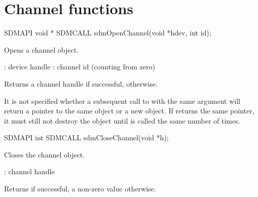 \documentclass[a4paper,12pt,twoside,extrafontsizes]{memoir}
\begin{document}
\section{Channel functions}
\label{sec:channelfunctions}



\begin{cfuncprototype}
SDMAPI void * SDMCALL sdmOpenChannel(void *hdev, int id);
\end{cfuncprototype}

\begin{funcdescr}
	Opens a channel object.
\end{funcdescr}

\begin{funcparams}
	: device handle
	: channel id (counting from zero)
\end{funcparams}

\begin{funcret}
	Returns a channel handle if successful,  otherwise.
\end{funcret}

\begin{funcremarks}
	It is not specified whether a subsequent call to  with the same  argument will return a pointer to the same object or a new object. If  returns the same pointer, it must still not destroy the object until  is called the same number of times.
\end{funcremarks}



\begin{cfuncprototype}
SDMAPI int SDMCALL sdmCloseChannel(void *h);
\end{cfuncprototype}

\begin{funcdescr}
	Closes the channel object.
\end{funcdescr}

\begin{funcparams}
	: channel handle
\end{funcparams}

\begin{funcret}
	Returns  if successful, a non-zero value otherwise.
\end{funcret}
\end{document}
